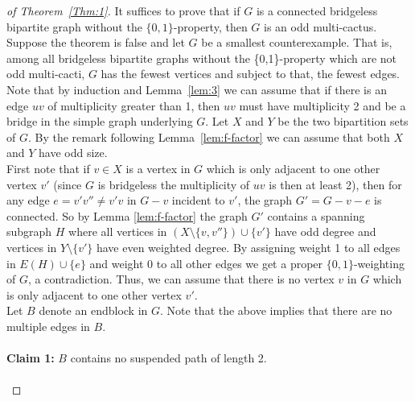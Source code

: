 \documentclass[
final,
 nomarks,
]{dmtcs-episciences}
\theoremstyle{definition}
\begin{document}
\begin{proof}[of Theorem~\ref{Thm:1}]
It suffices to prove that if $G$ is a connected bridgeless bipartite graph without the $\{0,1\}$-property, then $G$ is an odd multi-cactus. \\
Suppose the theorem is false and let $G$ be a smallest counterexample. That is, among all bridgeless bipartite graphs without the \{0,1\}-property which are not odd multi-cacti, $G$ has the fewest vertices and subject to that, the fewest edges. Note that by induction and Lemma~\ref{lem:3} we can assume that if there is an edge $uv$ of multiplicity greater than 1, then $uv$ must have multiplicity 2 and be a bridge in the simple graph underlying $G$. Let $X$ and $Y$ be the two bipartition sets of $G$. By the remark following Lemma~\ref{lem:f-factor} we can assume that both $X$ and $Y$ have odd size. \\
First note that if $v \in X$ is a vertex in $G$ which is only adjacent to one other vertex $v'$ (since $G$ is bridgeless the multiplicity of $uv$ is then at least 2), then for any edge $e=v'v'' \neq v'v$ in $G-v$ incident to $v'$, the graph $G'=G-v-e$ is connected. So by Lemma \ref{lem:f-factor} the graph $G'$ contains a spanning subgraph $H$ where all vertices in $(X \setminus \{v,v''\}) \cup \{v'\}$ have odd degree and vertices in $Y \setminus \{v'\}$ have even weighted degree. By assigning weight 1 to all edges in $E(H) \cup \{e\}$ and weight 0 to all other edges we get a proper $\{0,1\}$-weighting of $G$, a contradiction. Thus, we can assume that there is no vertex $v$ in $G$ which is only adjacent to one other vertex $v'$.  \\ 
Let $B$ denote an endblock in $G$. Note that the above implies that there are no multiple edges in $B$. \\ \\
\textbf{Claim 1:} $B$ contains no suspended path of length 2. \\ \\

\end{proof}
\end{document}

